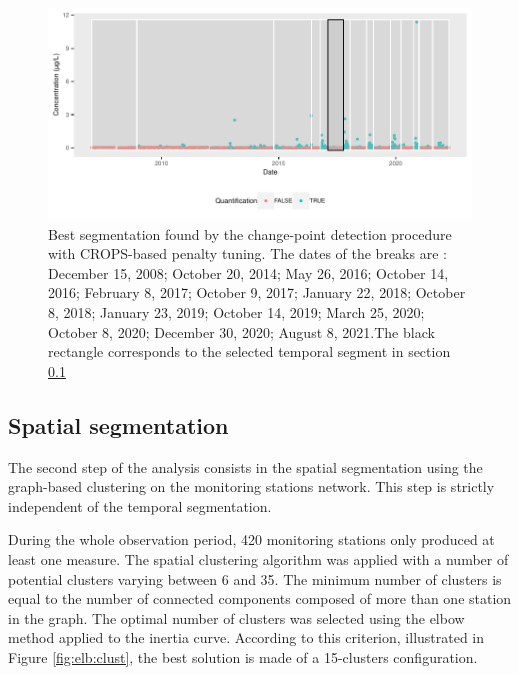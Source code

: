 \begin{figure}[htbp]
  \centering
  \includegraphics[]{figs/Chap5/Seg_opt-1.pdf}
  \caption{Best segmentation found by the change-point detection procedure with CROPS-based penalty tuning. The dates of the breaks are : December 15, 2008; October 20, 2014; May 26, 2016; October 14, 2016; February 8, 2017; October 9, 2017; January 22, 2018; October 8, 2018; January 23, 2019; October 14, 2019; March 25, 2020; October 8, 2020; December 30, 2020; August 8, 2021.The black rectangle corresponds to the selected temporal segment in section \ref{section:clust129}}\label{fig:seg}
\end{figure}


\subsection{Spatial segmentation}\label{section:clust129}

The second step of the analysis consists in the spatial segmentation using the graph-based clustering on the monitoring stations network. This step is strictly independent of the temporal segmentation. 


During the whole observation period, 420 monitoring stations only produced at least one measure. The spatial clustering algorithm was applied with a number of potential clusters varying between 6 and 35. The minimum number of clusters is equal to the number of connected components composed of more than one station in the graph. The optimal number of clusters was selected using the elbow method applied to the inertia curve. According to this criterion, illustrated in Figure \ref{fig:elb:clust}, the best solution is made of a 15-clusters configuration. 

